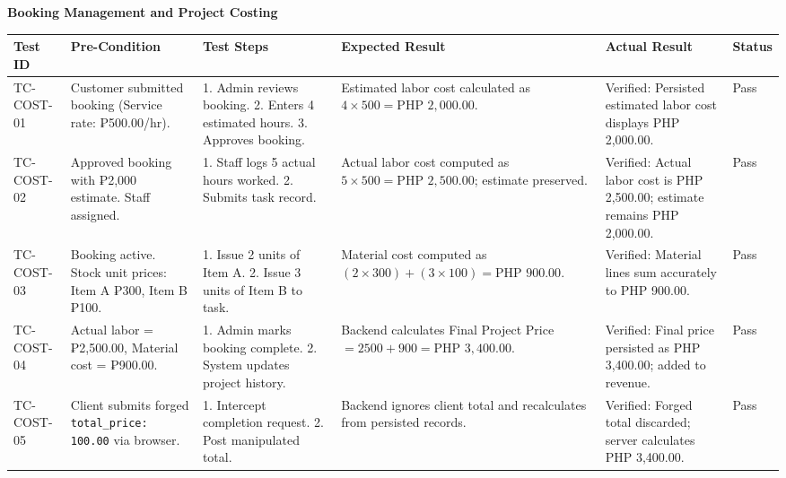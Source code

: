 \documentclass[12pt, letterpaper]{article}
\begin{document}
\begin{landscape}

    

\begin{center}\textbf{Booking Management and Project Costing}\end{center}
\centering

\begin{tabular}{p{2.2cm} p{3.8cm} p{5cm} p{5cm} p{3.5cm} p{1.5cm}}
\toprule
\textbf{Test ID} & \textbf{Pre-Condition} & \textbf{Test Steps} & \textbf{Expected Result} & \textbf{Actual Result} & \textbf{Status} \\
\midrule
TC-COST-01 & Customer submitted booking (Service rate: ₱500.00/hr). & 1. Admin reviews booking. 2. Enters 4 estimated hours. 3. Approves booking. & Estimated labor cost calculated as $4 \times 500 = \text{PHP } 2,000.00$. & Verified: Persisted estimated labor cost displays PHP 2,000.00. & Pass \\
TC-COST-02 & Approved booking with ₱2,000 estimate. Staff assigned. & 1. Staff logs 5 actual hours worked. 2. Submits task record. & Actual labor cost computed as $5 \times 500 = \text{PHP } 2,500.00$; estimate preserved. & Verified: Actual labor cost is PHP 2,500.00; estimate remains PHP 2,000.00. & Pass \\
TC-COST-03 & Booking active. Stock unit prices: Item A ₱300, Item B ₱100. & 1. Issue 2 units of Item A. 2. Issue 3 units of Item B to task. & Material cost computed as $(2 \times 300) + (3 \times 100) = \text{PHP } 900.00$. & Verified: Material lines sum accurately to PHP 900.00. & Pass \\
TC-COST-04 & Actual labor = ₱2,500.00, Material cost = ₱900.00. & 1. Admin marks booking complete. 2. System updates project history. & Backend calculates Final Project Price $= 2500 + 900 = \text{PHP } 3,400.00$. & Verified: Final price persisted as PHP 3,400.00; added to revenue. & Pass \\
TC-COST-05 & Client submits forged \texttt{total\_price: 100.00} via browser. & 1. Intercept completion request. 2. Post manipulated total. & Backend ignores client total and recalculates from persisted records. & Verified: Forged total discarded; server calculates PHP 3,400.00. & Pass \\
\bottomrule
\end{tabular}


\end{landscape}

\clearpage

\newpage
\end{document}
